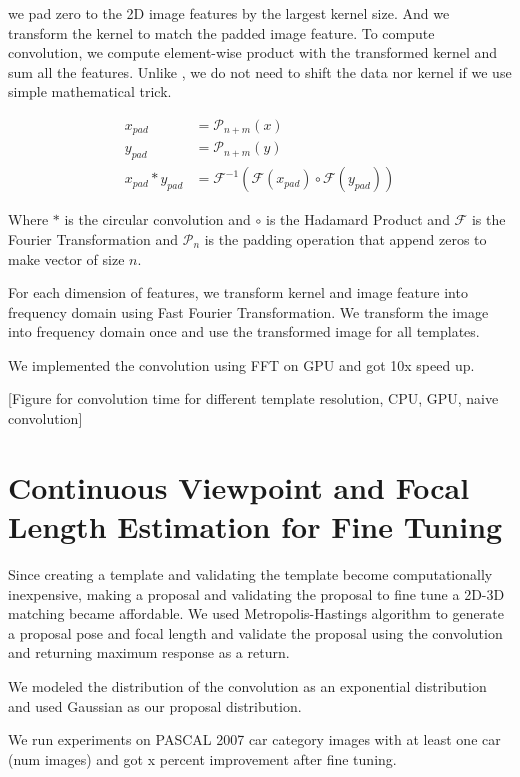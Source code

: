 \documentclass[10pt,twocolumn,letterpaper]{article}
\begin{document}
we pad zero to the 2D image features by the largest kernel size. And we transform the kernel to match the padded image feature. To compute convolution, we compute element-wise product with the transformed kernel and sum all the features. Unlike \cite{Podlozhnyuk}, we do not need to shift the data nor kernel if we use simple mathematical trick. 
  
\begin{align}
    x_{pad} & = \mathcal{P}_{n+m}(x)\\
    y_{pad} & = \mathcal{P}_{n+m}(y)\\
    x_{pad} \ast y_{pad} & = \mathcal{F}^{-1}(\mathcal{F}(x_{pad}) \circ \mathcal{F}(y_{pad}))
\end{align}

  Where $\ast$ is the circular convolution and $\circ$ is the Hadamard Product and $\mathcal{F}$ is the Fourier Transformation and $\mathcal{P}_n$ is the padding operation that append zeros to make vector of size $n$.

For each dimension of features, we transform kernel and image feature into frequency domain using Fast Fourier Transformation. We transform the image into frequency domain once and use the transformed image for all templates.

We implemented the convolution using FFT on GPU and got 10x speed up.

[Figure for convolution time for different template resolution, CPU, GPU, naive convolution]


\section{Continuous Viewpoint and Focal Length Estimation for Fine Tuning}

Since creating a template and validating the template become computationally inexpensive, making a proposal and validating the proposal to fine tune a 2D-3D matching became affordable. We used Metropolis-Hastings algorithm to generate a proposal pose and focal length and validate the proposal using the convolution and returning maximum response as a return.

We modeled the distribution of the convolution as an exponential distribution and used Gaussian as our proposal distribution.  

We run experiments on PASCAL 2007 car category images with at least one car (num images) and got x percent improvement after fine tuning.
\end{document}

